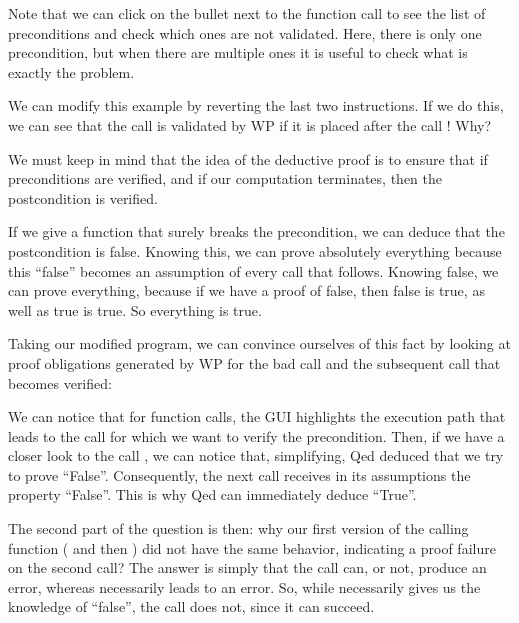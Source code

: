 
Note that we can click on the bullet next to the function call to see the
list of preconditions and check which ones are not validated. Here, there is
only one precondition, but when there are multiple ones it is useful to check
what is exactly the problem.



We can modify this example by reverting the last two instructions. If we
do this, we can see that the call  is validated by WP if
it is placed after the call ! Why?



We must keep in mind that the idea of the deductive proof is to ensure
that if preconditions are verified, and if our computation terminates,
then the postcondition is verified.



If we give a function that surely breaks the precondition, we can deduce
that the postcondition is false. Knowing this, we can prove absolutely
everything because this ``false'' becomes an assumption of every call
that follows. Knowing false, we can prove everything, because if we have
a proof of false, then false is true, as well as true is true. So
everything is true.



Taking our modified program, we can convince ourselves of this fact by
looking at proof obligations generated by WP for the bad call and the
subsequent call that becomes verified:







We can notice that for function calls, the GUI highlights the execution
path that leads to the call for which we want to verify the precondition.
Then, if we have a closer look to the call , we
can notice that, simplifying, Qed deduced that we try to prove
``False''. Consequently, the next call  receives in its
assumptions the property ``False''. This is why Qed can immediately
deduce ``True''.



The second part of the question is then: why our first version of the
calling function ( and then ) did
not have the same behavior, indicating a proof failure on the second
call? The answer is simply that the call  can, or not,
produce an error, whereas  necessarily leads to an
error. So, while  necessarily gives us the
knowledge of ``false'', the call  does not, since it can
succeed.



